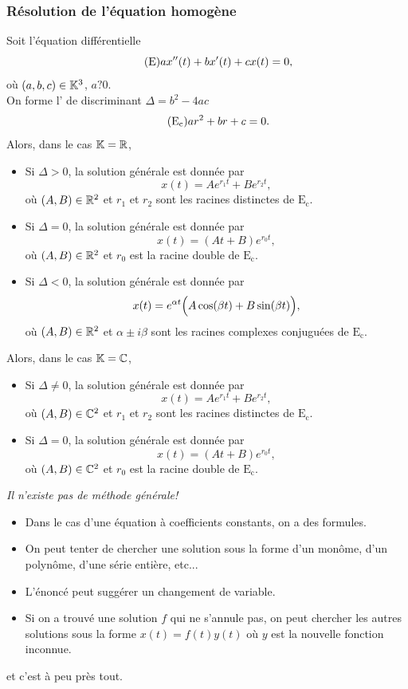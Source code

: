 \documentclass{book}
\begin{document}
\subsubsection{Résolution de l'équation homogène}

\begin{Proposition}
Soit l'équation différentielle
\[\tag{$\mathrm{E}$} ax''(t) + bx'(t) + cx(t) = 0,\]
où $(a,b,c)\in \mathbb{K}     ^3$, $a?0$.\\
On forme l' de discriminant $\Delta= b^2-4ac$
\[\tag{$\mathrm{E_c}$} ar^2 + br + c = 0.\]
Alors, dans le cas $\mathbb{K}     =\mathbb{R}    $,
\begin{itemize}
\item Si $\Delta> 0$, la solution générale est donnée par
  \[x(t) = A e^{r_1t} + B e^{r_2t},\]
  où $(A,B)\in \mathbb{R}    ^2$ et $r_1$ et $r_2$ sont les racines distinctes de $\mathrm{E_c}$.
\item Si $\Delta= 0$, la solution générale est donnée par
  \[x(t) = (A t+B) e^{r_0t},\]
  où $(A,B)\in \mathbb{R}    ^2$ et $r_0$ est la racine double de $\mathrm{E_c}$.
\item Si $\Delta< 0$, la solution générale est donnée par
  \[x(t) = e^{\alpha t} \Bigl( A \cos(\beta t) + B \sin(\beta t) \Bigr),\]
  où $(A,B)\in \mathbb{R}    ^2$ et $\alpha±i\beta$ sont les
  racines complexes conjuguées de $\mathrm{E_c}$.
\end{itemize}
Alors, dans le cas $\mathbb{K} =\mathbb{C}$,
\begin{itemize}
\item Si $\Delta\neq 0$, la solution générale est donnée par
  \[x(t) = A e^{r_1 t} + B e^{r_2 t},\]
  où $(A,B)\in \mathbb{C}^2$ et $r_1$ et $r_2$ sont les racines distinctes de $\mathrm{E_c}$.
\item Si $\Delta= 0$, la solution générale est donnée par
  \[x(t) = (A t+B) e^{r_0 t},\]
  où $(A,B)\in\mathbb{C}^2$ et $r_0$ est la racine double de $\mathrm{E_c}$.
\end{itemize}
\end{Proposition}
\begin{Proposition}
\emph{Il n'existe pas de méthode générale!}
\begin{itemize}
\item Dans le cas d'une équation à coefficients constants, on a des formules.
\item On peut tenter de chercher une solution sous la forme
  d'un monôme, d'un polynôme, d'une série entière, etc...
\item L'énoncé peut suggérer un changement de variable.
\item Si on a trouvé une solution $f$ qui ne s'annule pas,
  on peut chercher les autres solutions sous la forme $x(t) = f(t) y(t)$
  où $y$ est la nouvelle fonction inconnue.
\end{itemize}
et c'est à peu près tout.
\end{Proposition}
\end{document}
